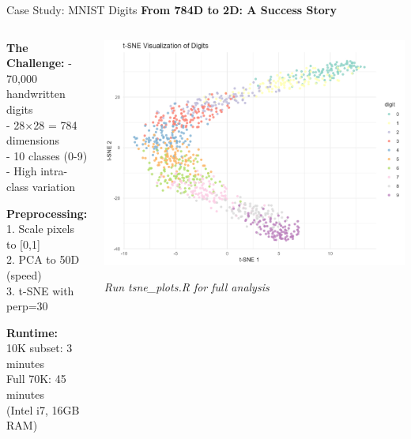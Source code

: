 \documentclass[10pt]{beamer}
\newcommand{\emphtext}[1]{\textcolor{upcblue}{\textbf{#1}}}
\begin{document}
\begin{frame}{Case Study: MNIST Digits}
\emphtext{From 784D to 2D: A Success Story}

\vspace{0.3cm}
\begin{columns}[T]
\begin{column}{0.48\textwidth}
\textbf{The Challenge:}
\footnotesize
- 70,000 handwritten digits\\
- 28×28 = 784 dimensions\\
- 10 classes (0-9)\\
- High intra-class variation

\vspace{0.2cm}
\textbf{Preprocessing:}
\footnotesize
1. Scale pixels to [0,1]\\
2. PCA to 50D (speed)\\
3. t-SNE with perp=30

\vspace{0.2cm}
\textbf{Runtime:}\\
\footnotesize
10K subset: 3 minutes\\
Full 70K: 45 minutes\\
(Intel i7, 16GB RAM)
\end{column}

\begin{column}{0.48\textwidth}
\begin{center}
\includegraphics[width=\linewidth]{./Figures/mnist_tsne.png}
\end{center}
\footnotesize\textit{Run tsne\_plots.R for full analysis}
\end{column}
\end{columns}


\end{frame}
\end{document}

